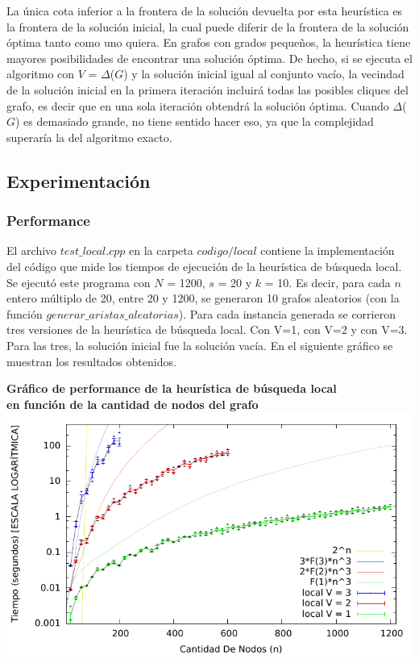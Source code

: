 \par{La única cota inferior a la frontera de la solución devuelta por esta
heurística es la frontera de la solución inicial, la cual puede diferir de la
frontera de la solución óptima tanto como uno quiera. En grafos con grados
pequeños, la heurística tiene mayores posibilidades de encontrar una solución
óptima. De hecho, si se ejecuta el algoritmo con $V$ = $\Delta$($G$) y la
solución inicial igual al conjunto vacío, la vecindad de la solución inicial
en la primera iteración incluirá todas las posibles cliques del grafo, es decir
que en una sola iteración obtendrá la solución óptima. Cuando $\Delta$($G$) es
demasiado grande, no tiene sentido hacer eso, ya que la complejidad superaría
la del algoritmo exacto.}

\subsection{Experimentación}

\subsubsection{Performance}

\par{El archivo $test\_local.cpp$ en la carpeta $codigo/local$ contiene la
implementación del código que mide los tiempos de ejecución de la heurística
de búsqueda local. Se ejecutó este programa con $N$ = 1200, $s$ = 20 y $k$ = 10.
Es decir, para cada $n$ entero múltiplo de 20, entre 20 y 1200, se generaron
10 grafos aleatorios (con la función $generar\_aristas\_aleatorias$). Para cada
instancia generada se corrieron tres versiones de la heurística de búsqueda
local. Con V=1, con V=2 y con V=3. Para las tres, la solución inicial fue la
solución vacía.
En el siguiente gráfico se muestran los resultados obtenidos.}

\begin{center}
\textbf{Gráfico de performance de la heurística de búsqueda local\\ en
función de la cantidad de nodos del grafo}
\includegraphics[scale=1.3]{imgs/local_1200_20_10.pdf}
\end{center}

